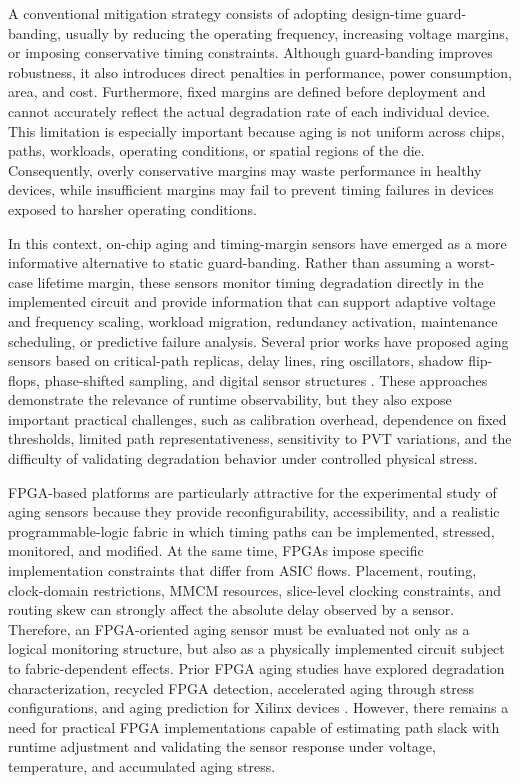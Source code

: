\documentclass[a4paper,10pt,twoside,twocolumn,final]{JICS_LaTexGuidelines}
\begin{document}
A conventional mitigation strategy consists of adopting design-time guard-banding, usually by reducing the operating frequency, increasing voltage margins, or imposing conservative timing constraints. Although guard-banding improves robustness, it also introduces direct penalties in performance, power consumption, area, and cost. Furthermore, fixed margins are defined before deployment and cannot accurately reflect the actual degradation rate of each individual device. This limitation is especially important because aging is not uniform across chips, paths, workloads, operating conditions, or spatial regions of the die. Consequently, overly conservative margins may waste performance in healthy devices, while insufficient margins may fail to prevent timing failures in devices exposed to harsher operating conditions.

In this context, on-chip aging and timing-margin sensors have emerged as a more informative alternative to static guard-banding. Rather than assuming a worst-case lifetime margin, these sensors monitor timing degradation directly in the implemented circuit and provide information that can support adaptive voltage and frequency scaling, workload migration, redundancy activation, maintenance scheduling, or predictive failure analysis. Several prior works have proposed aging sensors based on critical-path replicas, delay lines, ring oscillators, shadow flip-flops, phase-shifted sampling, and digital sensor structures \cite{agarwal2007failure,Ernst2004Razor,sensible,valdes,Self_Adjusting_Monitor,Huang2021RealTimeAgingPrediction}. These approaches demonstrate the relevance of runtime observability, but they also expose important practical challenges, such as calibration overhead, dependence on fixed thresholds, limited path representativeness, sensitivity to PVT variations, and the difficulty of validating degradation behavior under controlled physical stress.

FPGA-based platforms are particularly attractive for the experimental study of aging sensors because they provide reconfigurability, accessibility, and a realistic programmable-logic fabric in which timing paths can be implemented, stressed, monitored, and modified. At the same time, FPGAs impose specific implementation constraints that differ from ASIC flows. Placement, routing, clock-domain restrictions, MMCM resources, slice-level clocking constraints, and routing skew can strongly affect the absolute delay observed by a sensor. Therefore, an FPGA-oriented aging sensor must be evaluated not only as a logical monitoring structure, but also as a physically implemented circuit subject to fabric-dependent effects. Prior FPGA aging studies have explored degradation characterization, recycled FPGA detection, accelerated aging through stress configurations, and aging prediction for Xilinx devices \cite{aging_effects_fpga_amouri,short_circuit_aging,WID,Li2022FPGAAgingPrediction}. However, there remains a need for practical FPGA implementations capable of estimating path slack with runtime adjustment and validating the sensor response under voltage, temperature, and accumulated aging stress.
\end{document}

